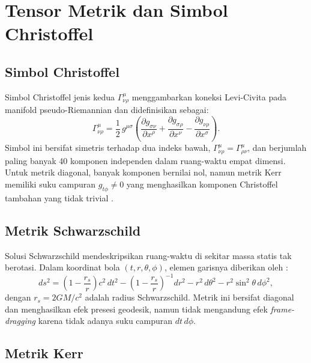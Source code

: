 \section{Tensor Metrik dan Simbol Christoffel}
\label{sec:metrik-christoffel}

\subsection{Simbol Christoffel}
\label{subsec:christoffel-umum}

Simbol Christoffel jenis kedua $\Gamma^\mu_{\nu\rho}$ menggambarkan koneksi Levi-Civita pada manifold pseudo-Riemannian dan didefinisikan sebagai:
\begin{equation}
    \Gamma^\mu_{\nu\rho} = \frac{1}{2}\, g^{\mu\sigma}
    \left(
        \frac{\partial g_{\sigma\nu}}{\partial x^\rho}
      + \frac{\partial g_{\sigma\rho}}{\partial x^\nu}
      - \frac{\partial g_{\nu\rho}}{\partial x^\sigma}
    \right).
    \label{eq:christoffel-def}
\end{equation}
Simbol ini bersifat simetris terhadap dua indeks bawah, $\Gamma^\mu_{\nu\rho} = \Gamma^\mu_{\rho\nu}$, dan berjumlah paling banyak 40 komponen independen dalam ruang-waktu empat dimensi. Untuk metrik diagonal, banyak komponen bernilai nol, namun metrik Kerr memiliki suku campuran $g_{t\phi} \neq 0$ yang menghasilkan komponen Christoffel tambahan yang tidak trivial \parencite{Carroll2004SpacetimeGeometry}.


\subsection{Metrik Schwarzschild}
\label{subsec:metrik-schwarzschild}

Solusi Schwarzschild mendeskripsikan ruang-waktu di sekitar massa statis tak berotasi. Dalam koordinat bola $(t, r, \theta, \phi)$, elemen garisnya diberikan oleh \parencite{Schwarzschild1916Field}:
\begin{equation}
    ds^2 = \left(1 - \frac{r_s}{r}\right) c^2\,dt^2
         - \left(1 - \frac{r_s}{r}\right)^{-1} dr^2
         - r^2\, d\theta^2
         - r^2 \sin^2\!\theta\, d\phi^2,
    \label{eq:schwarzschild}
\end{equation}
dengan $r_s = 2GM/c^2$ adalah radius Schwarzschild. Metrik ini bersifat diagonal dan menghasilkan efek presesi geodesik, namun tidak mengandung efek \textit{frame-dragging} karena tidak adanya suku campuran $dt\,d\phi$.


\subsection{Metrik Kerr}
\label{subsec:metrik-kerr}


